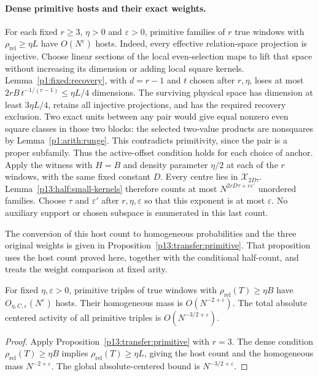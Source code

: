 \paragraph{Dense primitive hosts and their exact weights.}
\label{p18:conf:fixed-primitive}
For each fixed $r\ge3$, $\eta>0$ and $\varepsilon>0$, primitive
families of $r$ true windows with
$\rho_{\mathrm{rel}}\ge\eta L$ have $O(N^\varepsilon)$ hosts.
Indeed, every effective relation-space projection is injective. Choose
linear sections of the local even-selection maps to lift that space
without increasing its dimension or adding local square kernels.
Lemma~\ref{p1:fixed:recovery}, with $d=r-1$ and $t$ chosen after
$r,\eta$, loses at most $2rB\,t^{-1/(r-1)}\le\eta L/4$ dimensions.
The surviving physical space has dimension at least $3\eta L/4$,
retains all injective projections, and has the required recovery
exclusion. Two exact
units between any pair would give equal nonzero even square classes
in those two blocks: the selected two-value products are nonsquares
by Lemma~\ref{p1:arith:runge}. This contradicts primitivity, since
the pair is a proper subfamily. Thus the active-offset condition
holds for each choice of anchor. Apply the witness with $H=B$ and
density parameter $\eta/2$ at each of the $r$ windows, with the same
fixed constant $D$.
Every centre lies in $\mathcal X_{2D\tau}$.
Lemma~\ref{p13:half:small-kernels} therefore counts at most
$N^{2rD\tau+r\varepsilon'}$ unordered families. Choose $\tau$ and
$\varepsilon'$ after $r,\eta,\varepsilon$ so that this exponent is
at most $\varepsilon$. No auxiliary support or chosen subspace is
enumerated in this last count.

The conversion of this host count to homogeneous probabilities and the
three original weights is given in Proposition~\ref{p13:transfer:primitive}.
That proposition uses the host count proved here, together with the
conditional half-count, and treats the weight comparison at fixed arity.

\begin{theorem}
\label{p13:conf:dense-primitive}
For fixed \(\eta,\varepsilon>0\), primitive triples of
true windows with \(\rho_{\mathrm{rel}}(T)\ge\eta B\)
have \(O_{\eta,C,\varepsilon}(N^\varepsilon)\) hosts.
Their homogeneous mass is \(O(N^{-2+\varepsilon})\).
The total absolute centered activity of all primitive
triples is \(O(N^{-3/2+\varepsilon})\).
\end{theorem}

\begin{proof}
Apply Proposition~\ref{p13:transfer:primitive} with $r=3$.
The dense condition $\rho_{\mathrm{rel}}(T)\ge\eta B$ implies
$\rho_{\mathrm{rel}}(T)\ge\eta L$, giving the host count and the
homogeneous mass $N^{-2+\varepsilon}$. The global absolute-centered
bound is $N^{-3/2+\varepsilon}$.
\end{proof}

